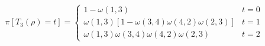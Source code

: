 \documentclass[10pt]{article}
\begin{document}
\begin{align*}\pi[T_3(\rho)=t]=\begin{cases}
1-\omega(1, 3) & t = 0\\
\omega(1, 3) [ 1 - \omega(3, 4)\omega(4,2)\omega(2,3)] &t = 1\\
\omega(1, 3)\omega(3, 4)\omega(4,2)\omega(2,3) &t=2
\end{cases}\end{align*}
\end{document}
